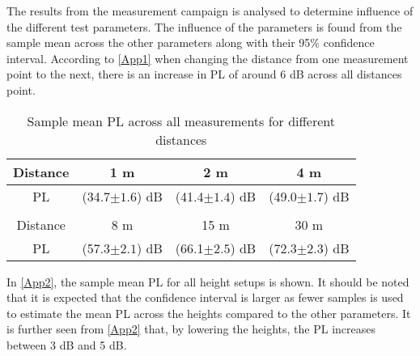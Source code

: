 
The results from the measurement campaign is analysed to determine influence of the different test parameters. The influence of the parameters is found from the sample mean across the other parameters along with their 95\% confidence interval. According to \autoref{App1} when changing the distance from one measurement point to the next, there is an increase in PL of around 6 dB across all distances point.
\vspace{2em}
\begin{table}[!htbp]
\centering
\caption{Sample mean PL across all measurements for different distances}
\label{App1}
\begin{tabular}{|c|c|c|c|}
\hline
Distance    & 1 m & 2 m& 4 m\\\hline
PL & (34.7$\pm 1.6$) dB & (41.4$\pm 1.4$) dB & (49.0$\pm 1.7$) dB  \\\hline
\multicolumn{4}{c}{}\\\hline
Distance	&8 m& 15 m& 30 m\\\hline
PL &	(57.3$\pm 2.1$) dB & (66.1$\pm 2.5$) dB & (72.3$\pm 2.3$) dB \\\hline
\end{tabular}
\end{table}


\newpage
In \autoref{App2}, the sample mean PL for all height setups is shown. It should be noted that it is expected that the confidence interval is larger as fewer samples is used to estimate the mean PL across the heights compared to the other parameters. It is further seen from \autoref{App2} that, by lowering the heights, the PL increases between 3 dB and 5 dB.

\begin{table}[H]
\centering
\caption{Sample mean PL across all measurements for different height combinations}
\label{App2}
\end{table}


